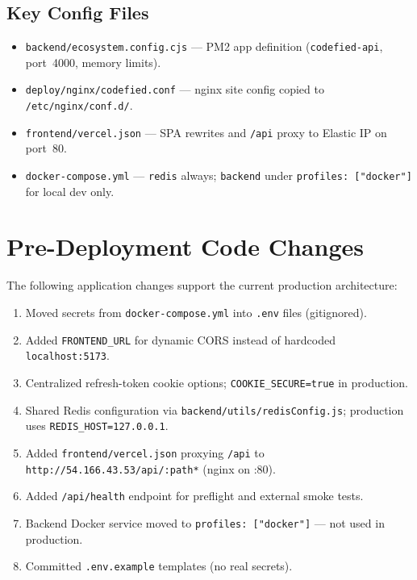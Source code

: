 \documentclass[11pt,a4paper]{article}
\begin{document}
\subsection{Key Config Files}
\begin{itemize}[noitemsep]
  \item \texttt{backend/ecosystem.config.cjs} --- PM2 app definition (\texttt{codefied-api}, port~4000, memory limits).
  \item \texttt{deploy/nginx/codefied.conf} --- nginx site config copied to \texttt{/etc/nginx/conf.d/}.
  \item \texttt{frontend/vercel.json} --- SPA rewrites and \texttt{/api} proxy to Elastic IP on port~80.
  \item \texttt{docker-compose.yml} --- \texttt{redis} always; \texttt{backend} under \texttt{profiles: ["docker"]} for local dev only.
\end{itemize}

\section{Pre-Deployment Code Changes}

The following application changes support the current production architecture:

\begin{enumerate}[noitemsep]
  \item Moved secrets from \texttt{docker-compose.yml} into \texttt{.env} files (gitignored).
  \item Added \texttt{FRONTEND\_URL} for dynamic CORS instead of hardcoded \texttt{localhost:5173}.
  \item Centralized refresh-token cookie options; \texttt{COOKIE\_SECURE=true} in production.
  \item Shared Redis configuration via \texttt{backend/utils/redisConfig.js}; production uses \texttt{REDIS\_HOST=127.0.0.1}.
  \item Added \texttt{frontend/vercel.json} proxying \texttt{/api} to \texttt{http://54.166.43.53/api/:path*} (nginx on :80).
  \item Added \texttt{/api/health} endpoint for preflight and external smoke tests.
  \item Backend Docker service moved to \texttt{profiles: ["docker"]} --- not used in production.
  \item Committed \texttt{.env.example} templates (no real secrets).
\end{enumerate}
\end{document}
